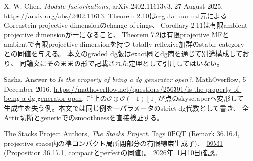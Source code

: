 X.-W. Chen,
\emph{Module factorizations},
arXiv:2402.11613v3, 27 August 2025.
\url{https://arxiv.org/abs/2402.11613}.
Theorem 2.10はregular normal元によるGorenstein-projective dimensionのchange-of-rings、
Corollary 2.11は有限ambient projective dimensionが一になること、
Theorem 7.2は有限projective MFとambientで有限projective dimensionを持つ
totally reflexive加群のstable categoryとの同値を与える。
本文のgraded dg版はexact圏とdg商を通じて別途構成しており、
同論文にそのままの形で記載された定理として引用してはいない。


Sasha,
Answer to \emph{Is the property of being a dg generator open?},
MathOverflow, 5 December 2016.
\url{https://mathoverflow.net/questions/256391/is-the-property-of-being-a-dg-generator-open}.
$\mathbb P^1$上の$\mathcal O\oplus\mathcal O(-1)[1]$が点のskyscraperへ変形して
生成性を失う例。本文では同じ例を一パラメータのstrict dg代数として書き、
全Artin切断とgenericでのsmoothnessを直接検証する。

The Stacks Project Authors,
\emph{The Stacks Project}.
Tags \href{https://stacks.math.columbia.edu/tag/0BQT}{0BQT}
(Remark 36.16.4, projective space内の準コンパクト局所閉部分の有限線束生成子)、
\href{https://stacks.math.columbia.edu/tag/09M1}{09M1}
(Proposition 36.17.1, compactとperfectの同値)。
2026年11月10日確認。
